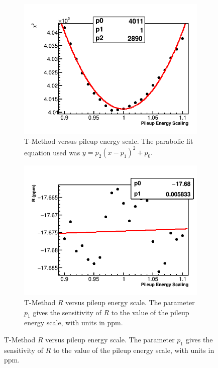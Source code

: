 \begin{figure}
\centering
    \begin{subfigure}[t]{0.45\textwidth}
        \centering
        \includegraphics[width=\textwidth]{TMethod_Chi2_Vs_PileupEnergyScaling_Canv}
        \caption{T-Method \chisq versus pileup energy scale. The parabolic fit equation used was $y = p_{2}(x - p_{1})^{2} + p_{0}.$}
    \end{subfigure}%
    \hspace{1cm}
    \begin{subfigure}[t]{0.45\textwidth}
        \centering
        \includegraphics[width=\textwidth]{TMethod_R_Vs_PileupEnergyScaling_Canv}
        \caption{T-Method $R$ versus pileup energy scale. The parameter $p_{1}$ gives the sensitivity of $R$ to the value of the pileup energy scale, with units in ppm.}
    \end{subfigure}


\end{figure}
